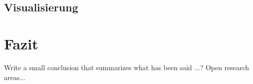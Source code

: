 \documentclass{acm_proc_article-sp-german}
\begin{document}
\subsection{Visualisierung}
\label{subsec:outputvis}

\section{Fazit}
\label{sec:conclusion}
Write a small conclusion that summarizes what has been said ...?
Open research areas...




\end{document}
